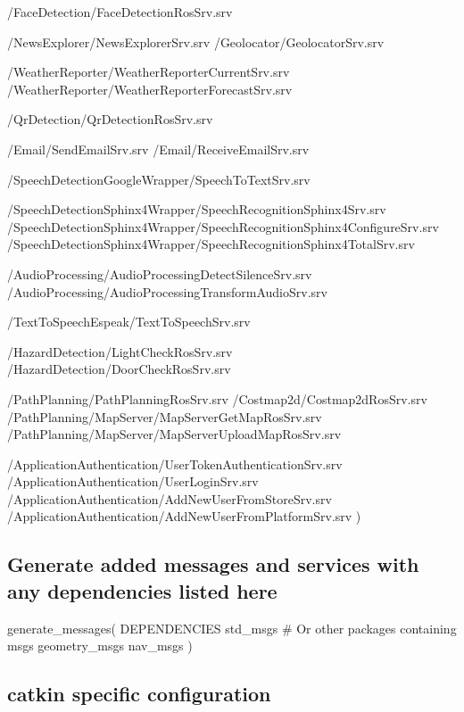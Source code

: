 /\-Face\-Detection/\-Face\-Detection\-Ros\-Srv.srv

/\-News\-Explorer/\-News\-Explorer\-Srv.srv /\-Geolocator/\-Geolocator\-Srv.srv

/\-Weather\-Reporter/\-Weather\-Reporter\-Current\-Srv.srv /\-Weather\-Reporter/\-Weather\-Reporter\-Forecast\-Srv.srv

/\-Qr\-Detection/\-Qr\-Detection\-Ros\-Srv.srv

/\-Email/\-Send\-Email\-Srv.srv /\-Email/\-Receive\-Email\-Srv.srv

/\-Speech\-Detection\-Google\-Wrapper/\-Speech\-To\-Text\-Srv.srv

/\-Speech\-Detection\-Sphinx4\-Wrapper/\-Speech\-Recognition\-Sphinx4\-Srv.srv /\-Speech\-Detection\-Sphinx4\-Wrapper/\-Speech\-Recognition\-Sphinx4\-Configure\-Srv.srv /\-Speech\-Detection\-Sphinx4\-Wrapper/\-Speech\-Recognition\-Sphinx4\-Total\-Srv.srv

/\-Audio\-Processing/\-Audio\-Processing\-Detect\-Silence\-Srv.srv /\-Audio\-Processing/\-Audio\-Processing\-Transform\-Audio\-Srv.srv

/\-Text\-To\-Speech\-Espeak/\-Text\-To\-Speech\-Srv.srv

/\-Hazard\-Detection/\-Light\-Check\-Ros\-Srv.srv /\-Hazard\-Detection/\-Door\-Check\-Ros\-Srv.srv

/\-Path\-Planning/\-Path\-Planning\-Ros\-Srv.srv /\-Costmap2d/\-Costmap2d\-Ros\-Srv.srv /\-Path\-Planning/\-Map\-Server/\-Map\-Server\-Get\-Map\-Ros\-Srv.srv /\-Path\-Planning/\-Map\-Server/\-Map\-Server\-Upload\-Map\-Ros\-Srv.srv

/\-Application\-Authentication/\-User\-Token\-Authentication\-Srv.srv /\-Application\-Authentication/\-User\-Login\-Srv.srv /\-Application\-Authentication/\-Add\-New\-User\-From\-Store\-Srv.srv /\-Application\-Authentication/\-Add\-New\-User\-From\-Platform\-Srv.srv )

\subsection*{Generate added messages and services with any dependencies listed here}

generate\-\_\-messages( D\-E\-P\-E\-N\-D\-E\-N\-C\-I\-E\-S std\-\_\-msgs \# Or other packages containing msgs geometry\-\_\-msgs nav\-\_\-msgs )

\subparagraph*{}

\subsection*{catkin specific configuration}


